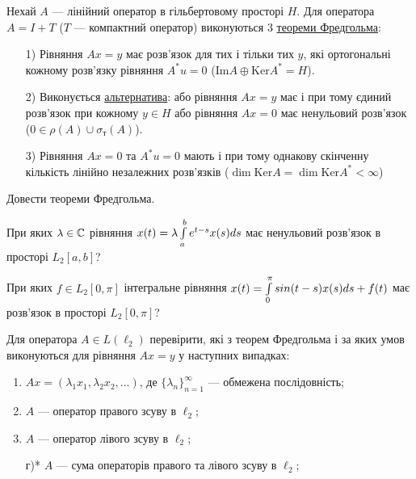 
\begin{theory}
    Нехай $A$ --- лінійний оператор в гільбертовому просторі $H$. 
    Для оператора $A = I + T$ ($T$ --- компактний оператор) виконуються 
    3 \ul{теореми Фредгольма}:
    \begin{enumerate}
        \item[1)] Рівняння $Ax = y$ має розв'язок для тих і 
        тільки тих $y$, які ортогональні кожному розв'язку рівняння 
        $A^*u = 0$ ($\mathrm{Im} A \oplus \mathrm{Ker} A^* = H$).
        \item[2)] Виконується \ul{альтернатива}: або рівняння $Ax = y$ 
        має і при тому єдиний розв'язок при кожному $y \in H$ або рівняння 
        $Ax = 0$ має ненульовий розв'язок ($0 \in \rho(A) \cup \sigma_\text{т}(A)$).
        \item[3)] Рівняння $Ax = 0$ та $A^* u = 0$ мають і при тому 
        однакову скінченну кількість лінійно незалежних розв'язків 
        ($\dim \mathrm{Ker} A = \dim \mathrm{Ker} A^* < \infty$)
    \end{enumerate}
\end{theory}

\begin{exercise}
    Довести теореми Фредгольма.
\end{exercise}

\begin{exercise}
    При яких $\lambda \in \mathbb{C}$ рівняння $x(t) = \lambda 
    \int\limits_{a}^{b}e^{t-s}x(s)ds$ має ненульовий розв'язок в просторі 
    $L_2[a, b]$?
\end{exercise}

\begin{exercise}
    При яких $f \in L_2 [0, \pi]$ інтегральне рівняння $x(t) = 
    \int\limits_{0}^{\pi} sin(t-s)x(s)ds + f(t)$ має розв'язок в просторі 
    $L_2[0, \pi]$?
\end{exercise}

\begin{exercise}
    Для оператора $A \in L(\ell_2)$ перевірити, які з теорем 
    Фредгольма і за яких умов виконуються для рівняння $Ax = y$ у 
    наступних випадках:
    \begin{enumerate}
        \item $Ax = (\lambda_1 x_1, \lambda_2 x_2, ...)$, де 
        $\{\lambda_n\}_{n=1}^\infty$ --- обмежена послідовність;
        \item $A$ --- оператор правого зсуву в $\ell_2$;
        \item $A$ --- оператор лівого зсуву в $\ell_2$;
        \item[г)*] $A$ --- сума операторів правого та лівого 
        зсуву в $\ell_2$;
    \end{enumerate}
\end{exercise}

